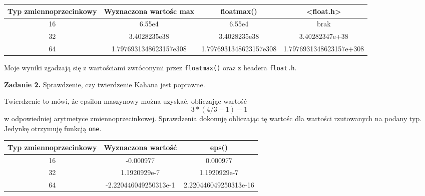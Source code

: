 \documentclass[15pt, a4paper]{article}
\begin{document}
\begin{table}[ht]
    \begin{adjustbox}{max width=\textwidth}
    \begin{tabular}{|c|c|c|c|}
        \hline 
        Typ zmiennoprzecinkowy & Wyznaczona wartośc max & floatmax() & <float.h> \\ \hline
        16 & 6.55e4 & 6.55e4 & brak \\ \hline
        32 & 3.4028235e38 & 3.4028235e38 & 3.40282347e+38 \\ \hline
        64 & 1.7976931348623157e308 & 1.7976931348623157e308 & 1.7976931348623157e+308 \\ \hline
    \end{tabular}
    \end{adjustbox}
    \label{tab:max}
\end{table}

Moje wyniki zgadzają się z wartościami zwróconymi przez \verb|floatmax()| oraz z headera \verb|float.h|.

\vspace{0.5cm}

\noindent\hrulefill


\vspace{0.5cm}

\noindent\textbf{Zadanie 2.} Sprawdzenie, czy twierdzenie Kahana jest poprawne.

\vspace{0.5cm}

Twierdzenie to mówi, że epsilon maszynowy można uzyskać, obliczając wartość \[3 * (4 / 3 - 1) - 1\] w odpowiedniej arytmetyce zmiennoprzecinkowej. Sprawdzenia dokonuję obliczając tę wartośc dla wartości rzutowanych na podany typ. Jedynkę otrzymuję funkcją \verb|one|.

\begin{table}[ht]
    \begin{adjustbox}{max width=\textwidth}
    \begin{tabular}{|c|c|c|}
        \hline 
        Typ zmiennoprzecinkowy & Wyznaczona wartość & eps() \\ \hline
        16 & -0.000977 & 0.000977 \\ \hline
        32 & 1.1920929e-7 & 1.1920929e-7 \\ \hline
        64 & -2.220446049250313e-1 & 2.220446049250313e-16 \\ \hline
    \end{tabular}
    \end{adjustbox}
    \label{tab:kahan}
\end{table}
\end{document}

